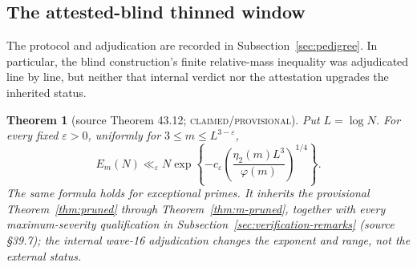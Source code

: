\documentclass[10pt,reqno]{amsart}
\newtheorem{theorem}{Theorem}[section]
\theoremstyle{definition}
\newcommand{\1}{\mathbf 1}
\newcommand{\eps}{\varepsilon}
\begin{document}
\subsection{The attested-blind thinned window}
The protocol and adjudication are recorded in
Subsection~\ref{sec:pedigree}.  In particular, the blind construction's
finite relative-mass inequality was adjudicated line by line, but neither
that internal verdict nor the attestation upgrades the inherited status.

\begin{theorem}[source Theorem 43.12; \textsc{claimed/provisional}]
\label{thm:general-three-quarter}
Put $L=\log N$.  For every fixed $\eps>0$, uniformly for
$3\leq m\leq L^{3-\eps}$,
\begin{equation}\tag{43.35}
 E_m(N)\ll_\eps N\exp\left\{-c_\eps
 \left(\frac{\eta_2(m)L^3}{\varphi(m)}\right)^{1/4}\right\}.
\end{equation}
The same formula holds for exceptional primes.  It inherits the provisional
Theorem~\ref{thm:pruned} through Theorem~\ref{thm:m-pruned}, together with
every maximum-severity qualification in
Subsection~\ref{sec:verification-remarks} (source \S39.7); the internal
wave-16 adjudication changes the exponent and range, not the external
status.
\end{theorem}
\end{document}
